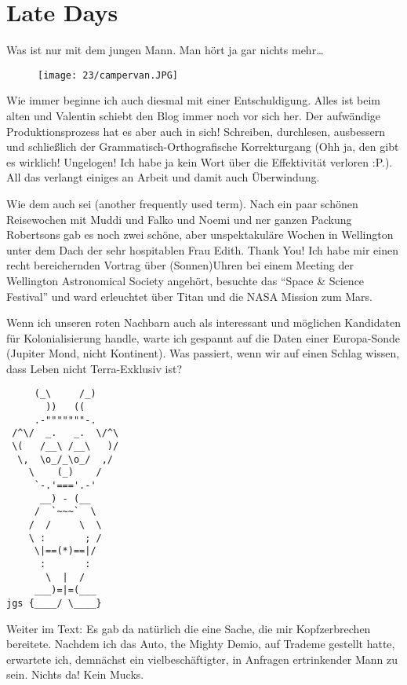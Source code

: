 \chapter{Late Days}

Was ist nur mit dem jungen Mann. Man hört ja gar nichts mehr\ldots{}

\begin{figure}[h]
  \centering
  \texttt{[image: 23/campervan.JPG]}
\end{figure}

Wie immer beginne ich auch diesmal mit einer Entschuldigung. Alles ist
beim alten und Valentin schiebt den Blog immer noch vor sich her. Der
aufwändige Produktionsprozess hat es aber auch in sich! Schreiben,
durchlesen, ausbessern und schließlich der Grammatisch-Orthografische
Korrekturgang (Ohh ja, den gibt es wirklich! Ungelogen! Ich habe ja kein
Wort über die Effektivität verloren :P.). All das verlangt einiges an
Arbeit und damit auch Überwindung.

Wie dem auch sei (another frequently used term). Nach ein paar schönen
Reisewochen mit Muddi und Falko und Noemi und ner ganzen Packung
Robertsons gab es noch zwei schöne, aber unspektakuläre Wochen in
Wellington unter dem Dach der sehr hospitablen Frau Edith. Thank You!
Ich habe mir einen recht bereichernden Vortrag über (Sonnen)Uhren bei
einem Meeting der Wellington Astronomical Society angehört, besuchte das
``Space \& Science Festival'' und ward erleuchtet über Titan und die NASA
Mission zum Mars.

Wenn ich unseren roten Nachbarn auch als interessant und möglichen
Kandidaten für Kolonialisierung handle, warte ich gespannt auf die Daten
einer Europa-Sonde (Jupiter Mond, nicht Kontinent). Was passiert, wenn
wir auf einen Schlag wissen, dass Leben nicht Terra-Exklusiv ist?

\begin{verbatim}
     (_\     /_)
       ))   ((
     .-"""""""-.
 /^\/  _.   _.  \/^\
 \(   /__\ /__\   )/
  \,  \o_/_\o_/  ,/
    \    (_)    /
     `-.'==='.-'
      __) - (__
     /  `~~~`  \
    /  /     \  \
    \ :       ; /
     \|==(*)==|/
      :       :
       \  |  /
     ___)=|=(___
jgs {____/ \____}
\end{verbatim}

Weiter im Text: Es gab da natürlich die eine Sache, die mir
Kopfzerbrechen bereitete. Nachdem ich das Auto, the Mighty Demio, auf
Trademe gestellt hatte, erwartete ich, demnächst ein
vielbeschäftigter, in Anfragen ertrinkender Mann zu sein. Nichts da!
Kein Mucks.

